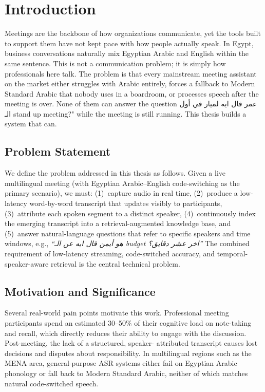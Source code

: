 
\chapter{Introduction}
\label{ch:intro}

Meetings are the backbone of how organizations communicate,
 yet the tools built to support them have not kept pace with how people actually speak.
In Egypt, business conversations naturally mix Egyptian Arabic and English within the same sentence.
This is not a communication problem; it is simply how professionals here talk.
The problem is that every mainstream meeting assistant on the market either struggles with Arabic entirely,
forces a fallback to Modern Standard Arabic that nobody uses in a boardroom,
or processes speech after the meeting is over. None of them can answer the question
عمر قال ايه لميار في أول الـ stand up meeting?" while the meeting is still running. This thesis builds a system that can.

\section{Problem Statement}
\label{sec:problem-statement}

We define the problem addressed in this thesis as follows. Given a live
multilingual meeting (with Egyptian Arabic--English code-switching as the
primary scenario), we must: (1)~capture audio in real time, (2)~produce a
low-latency word-by-word transcript that updates visibly to participants, (3)~attribute each spoken segment to a
distinct speaker, (4)~continuously index the emerging transcript into a
retrieval-augmented knowledge base, and (5)~answer natural-language questions
that refer to specific speakers and time windows, e.g., \textit{``هو أيمن قال ايه عن الـ budget اخر عشر دقايق؟''} The combined requirement of
low-latency streaming, code-switched accuracy, and temporal-speaker-aware
retrieval is the central technical problem.

\section{Motivation and Significance}
\label{sec:motivation}

Several real-world pain points motivate this work. Professional meeting
participants spend an estimated 30--50\% of their cognitive load on
note-taking and recall, which directly reduces their ability to engage
with the discussion. Post-meeting, the lack of a structured, speaker-
attributed transcript causes lost decisions and disputes about
responsibility. In multilingual regions such as the MENA area,
general-purpose ASR systems either fail on Egyptian Arabic phonology or
fall back to Modern Standard Arabic, neither of which matches natural
code-switched speech.

